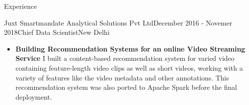 \documentclass{resume} %
\begin{document}
\begin{rSection}{Experience}
\begin{rSubsection}{Juxt Smartmandate Analytical Solutions Pvt Ltd}{December
	    2016 - Novemer 2018}{Chief Data Scientist}{New Delhi}
\begin{itemize}
\begin{itemize}
				into structured, analyzable data
			    \item generate recommendations for users across various kinds of
				sections in an EHR
			    \item automatically code medical information using SNOMED CT - a
				hierarchical medical terminology coding standard - which allows users
				to better query their data.
			\end{itemize}
		    \item \textbf{Building Recommendation Systems for an online Video Streaming Service}
			I built a content-based recommendation system for
			varied video containing feature-length video clips as well as short
			videos, working with a variety of features like the video metadata
			and other annotations. This recommendation system was also ported to
			Apache Spark before the final deployment.
		\end{itemize}
	\end{rSubsection}


\end{rSection}
\end{document}
